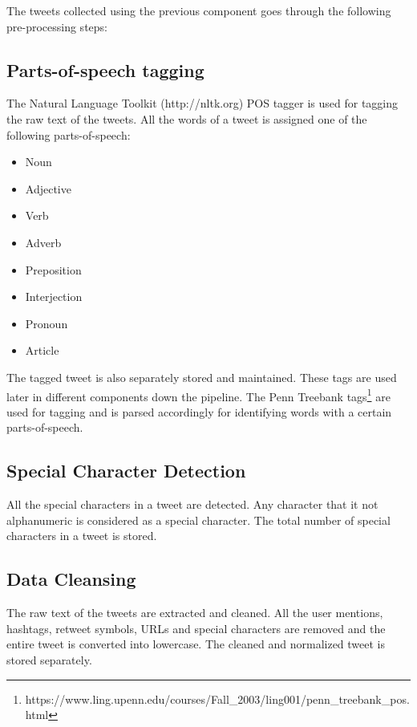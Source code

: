 
The tweets collected using the previous component goes through the following pre-processing steps:


\subsection{Parts-of-speech tagging} 
The Natural Language Toolkit (http://nltk.org) POS tagger is used for tagging the raw text of the tweets. All the words of a tweet is assigned one of the following parts-of-speech:
\begin{itemize}
\item Noun
\item Adjective
\item Verb
\item Adverb
\item Preposition
\item Interjection
\item Pronoun
\item Article
\end{itemize}

The tagged tweet is also separately stored and maintained. These tags are used later in different components down the pipeline. The Penn Treebank tags\footnote{https://www.ling.upenn.edu/courses/Fall\_2003/ling001/penn\_treebank\_pos.html} are used for tagging and is parsed accordingly for identifying words with a certain parts-of-speech.

\subsection{Special Character Detection}
All the special characters in a tweet are detected. Any character that it not alphanumeric is considered as a special character. The total number of special characters in a tweet is stored.


\subsection{Data Cleansing}
The raw text of the tweets are extracted and cleaned. All the user mentions, hashtags, retweet symbols, URLs and special characters are removed and the entire tweet is converted into lowercase. The cleaned and normalized tweet is stored separately.

